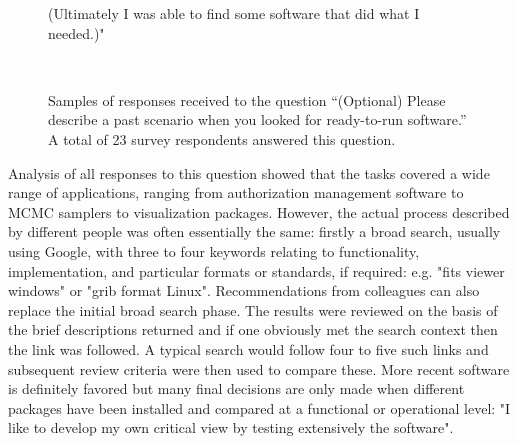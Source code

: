 \documentclass{casicswhitepaper}
\begin{document}
\begin{figure}[t]
{\begin{minipage}{5.5in}
(Ultimately I was able to find some software that did what I needed.)"  \end{minipage}}\\
  \vspace*{1.5ex}
  \caption{Samples of responses received to the question ``(Optional) Please describe a past scenario when you looked for ready-to-run software.''  A total of 23 survey respondents answered this question.}
  \label{sample-responses}
\end{figure}  

Analysis of all responses to this question showed that the tasks covered a wide range of applications, ranging from authorization management software to MCMC samplers to visualization packages. However, the actual process described by different people was often essentially the same: firstly a broad search, usually using Google, with three to four keywords relating to functionality, implementation, and particular formats or standards, if required: e.g. "fits viewer windows" or "grib format Linux". Recommendations from colleagues can also replace the initial broad search phase. The results were reviewed on the basis of the brief descriptions returned and if one obviously met the search context then the link was followed. A typical search would follow four to five such links and subsequent review criteria were then used to compare these. More recent software is definitely favored but many final decisions are only made when different packages have been installed and compared at a functional or operational level: "I like to develop my own critical view by testing extensively the software".
\end{document}
